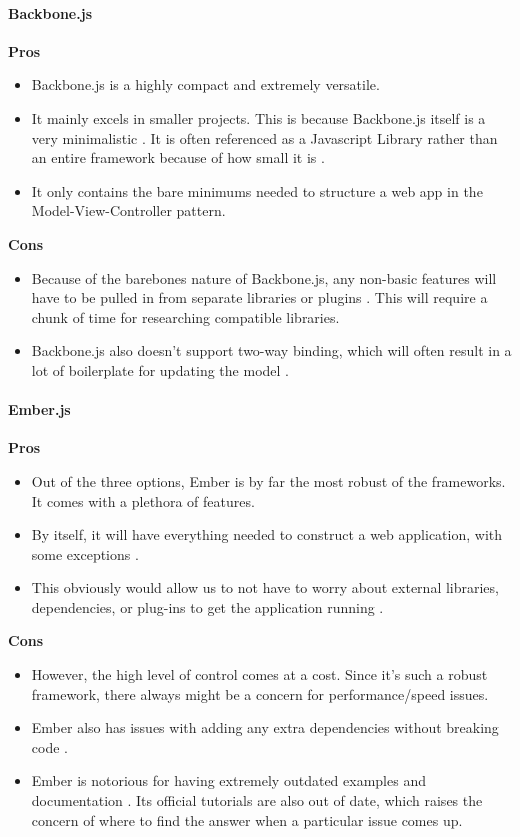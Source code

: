 	\paragraph{Backbone.js}	
	\textbf{Pros}	
			\begin{itemize}
				\item Backbone.js is a highly compact and extremely versatile. 
				\item It mainly excels in smaller projects. This is because Backbone.js itself is a very minimalistic \cite{mvc}. It is often referenced as a Javascript Library rather than an entire framework because of how small it is \cite{mvc}. 
				\item It only contains the bare minimums needed to structure a web app in the Model-View-Controller pattern.
			\end{itemize}
	\textbf{Cons}
		\begin{itemize}
			\item Because of the barebones nature of Backbone.js, any non-basic features will have to be pulled in from separate libraries or plugins \cite{mvc}. This will require a chunk of time for researching compatible libraries. 
			\item Backbone.js also doesn't support two-way binding, which will often result in a lot of boilerplate for updating the model \cite{mvc}.
		\end{itemize}
	\paragraph{Ember.js}
	
		\textbf{Pros}
			\begin{itemize}
				\item Out of the three options, Ember is by far the most robust of the frameworks. It comes with a plethora of features. 
				\item By itself, it will have everything needed to construct a web application, with some exceptions \cite{mvc}. 
				\item This obviously would allow us to not have to worry about external libraries, dependencies, or plug-ins to get the application running \cite{mvc}.
			\end{itemize}
		\textbf{Cons}
			\begin{itemize}
				\item However, the high level of control comes at a cost. Since it's such a robust framework, there always might be a concern for performance/speed issues. 
				\item Ember also has issues with adding any extra dependencies without breaking code \cite{mvc}.
				\item Ember is notorious for having extremely outdated examples and documentation \cite{mvc}. Its official tutorials are also out of date, which raises the concern of where to find the answer when a particular issue comes up.
			\end{itemize}	

